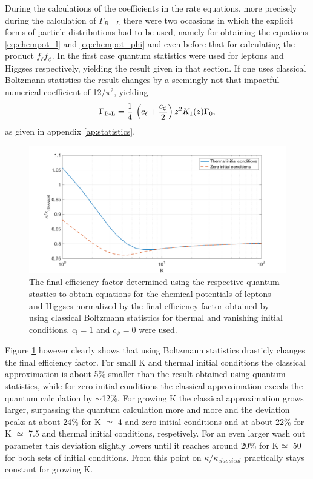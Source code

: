 During the calculations of the coefficients in the rate equations, more precisely during the calculation of $\Gamma_{B-L}$ there were two occasions in which the explicit forms of particle distributions had to be used, namely for obtaining the equations \eqref{eq:chempot_l} and \eqref{eq:chempot_phi} and even before that for calculating the product $f_\ell f_\phi$. \newline \indent
In the first case quantum statistics were used for leptons and Higgses respectively, yielding the result given in that section. If one uses classical Boltzmann statistics the result changes by a seemingly not that impactful numerical coefficient of 12/$\pi^2$, yielding
\begin{equation}
\Gamma\textsubscript{B-L}=\frac{1}{4}\:\left(c_\ell+\frac{c_\phi}{2}\right)z^2K_1(z)\Gamma_0,
\label{eq:Gamma_B-l_classical}
\end{equation}
as given in appendix \ref{ap:statistics}.
\begin{figure}[H]
	\centering
	\includegraphics[width=0.8\linewidth]{Images/quantum}
	\caption{The final efficiency factor determined using the respective quantum stastics to obtain equations for the chemical potentials of leptons and Higgses normalized by the final efficiency factor obtained by using classical Boltzmann statistics for thermal and vanishing initial conditions. $c_l=1$ and $c_\phi=0$ were used.}
	\label{fig:quantum}
\end{figure} \noindent
Figure \ref{fig:quantum} however clearly shows that using Boltzmann statistics drasticly changes the final efficiency factor. For small K and thermal initial conditions the classical approximation is about 5\% smaller than the result obtained using quantum statistics, while for zero initial conditions the classical approximation exeeds the quantum calculation by $\sim$12\%. For growing K the classical approximation grows larger, surpassing the quantum calculation more and more and the deviation peaks at about 24\% for K $\simeq$ 4 and zero initial conditions and at about 22\% for K $\simeq$ 7.5 and thermal initial conditions, respetively. For an even larger wash out parameter this deviation slightly lowers until it reaches around 20\% for K$\simeq$ 50 for both sets of initial conditions. From this point on $\kappa/\kappa_{classical}$ practically stays constant for growing K.
